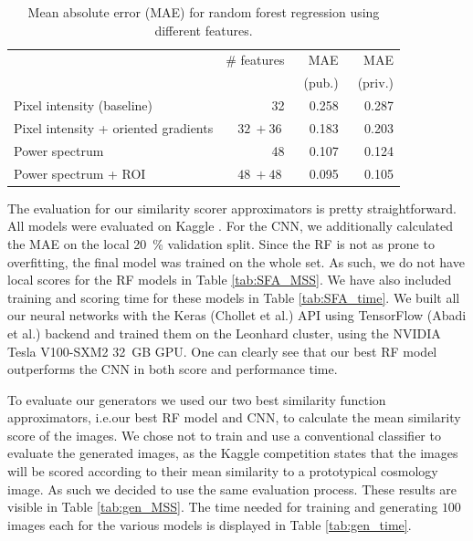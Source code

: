 \documentclass[10pt,conference,compsocconf]{IEEEtran}
\begin{document}
\begin{table}\centering
    \begin{tabular}{lrrr}
    \toprule
        & \# features & MAE & MAE \\
        & & ~(pub.) & ~(priv.) \\
    \midrule
        Pixel intensity (baseline) & \SI{32}{} & \SI{0.258}{} & \SI{0.287}{}  \\
        Pixel intensity + oriented gradients & $\SI{32}{} + \SI{36}{}$ & \SI{0.183}{} & \SI{0.203}{} \\
        Power spectrum & \SI{48}{} & \SI{0.107}{} & \SI{0.124}{} \\
        Power spectrum + ROI & $\SI{48}{} + \SI{48}{}$ & \SI{0.095}{} & \SI{0.105}{} \\
    \bottomrule
    \end{tabular}
\caption{Mean absolute error (MAE) for random forest regression using different features.}
\label{tab:RF}
\end{table}

The evaluation for our similarity scorer approximators is pretty straightforward. All models were evaluated on Kaggle \cite{Kaggle}. 
For the CNN, we additionally calculated the MAE on the local \SI{20}{\percent} validation split. Since the RF is not as prone to overfitting, the final model was trained on the whole set. As such, we do not have local scores for the RF models in Table \ref{tab:SFA_MSS}.
We have also included training and scoring time for these models in Table \ref{tab:SFA_time}. We built all our neural networks with the Keras (Chollet et al.\@ \cite{chollet2015keras}) API using TensorFlow (Abadi et al.\@ \cite{tensorflow2015-whitepaper}) backend and trained them on the Leonhard cluster, using the NVIDIA Tesla V100-SXM2 \SI{32}{GB} GPU. One can clearly see that our best RF model outperforms the CNN in both score and performance time.

To evaluate our generators we used our two best similarity function approximators, i.e.\@ our best RF model and CNN, to calculate the mean similarity score of the images. We chose not to train and use a conventional classifier to evaluate the generated images, as the Kaggle competition states that the images will be scored according to their mean similarity to a prototypical cosmology image. As such we decided to use the same evaluation process. These results are visible in Table \ref{tab:gen_MSS}. The time needed for training and generating $100$ images each for the various models is displayed in Table \ref{tab:gen_time}. 
\end{document}
